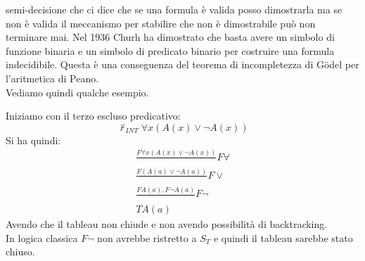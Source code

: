 \documentclass[a4paper,12pt, oneside]{book}
\begin{document}
semi-decisione che ci dice che se una formula è valida posso dimostrarla ma se
non è valida il meccanismo per stabilire che non è dimostrabile può non
terminare mai. Nel 1936 Churh ha dimostrato che basta avere un simbolo di
funzione binaria e un simbolo di predicato binario per costruire una formula
indecidibile. Questa è una conseguenza del teorema di incompletezza di
G\"{o}del per l'aritmetica di Peano.\\
Vediamo quindi qualche esempio.
\begin{esempio}
  Iniziamo con il terzo escluso predicativo:
  \[\nvdash_{INT}\forall x(A(x)\lor \neg A(x))\]
  Si ha quindi:
  \begin{gather*}
    \frac{F\forall x(A(x)\lor \neg A(x))}{}F\forall\\
    \frac{F (A(a)\lor \neg A(a))}{}F\lor\\
    \frac{FA(a),F\neg A(a)}{}F\neg\\
    TA(a)
  \end{gather*}
  Avendo che il tableau non chiude e non avendo possibilità di backtracking.\\
  In logica classica $F\neg$ non avrebbe ristretto a $S_T$ e quindi il tableau
  sarebbe stato chiuso.
\end{esempio}
\end{document}
